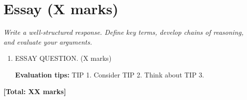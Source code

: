 \newpage

\section*{Essay (X marks)}

\textit{Write a well-structured response. Define key terms, develop chains of reasoning, and evaluate your arguments.}

\vspace{0.5em}

\begin{enumerate}[leftmargin=*, label=\textbf{\arabic*.}]

    \item ESSAY QUESTION. \hfill (X marks)\\[0.8em]
    \begin{keypoint}
        \textbf{Evaluation tips:} TIP 1. Consider TIP 2. Think about TIP 3.
    \end{keypoint}
    \vspace{12cm}

\end{enumerate}

\vfill
\begin{center}
    \textbf{[Total: XX marks]}
\end{center}


